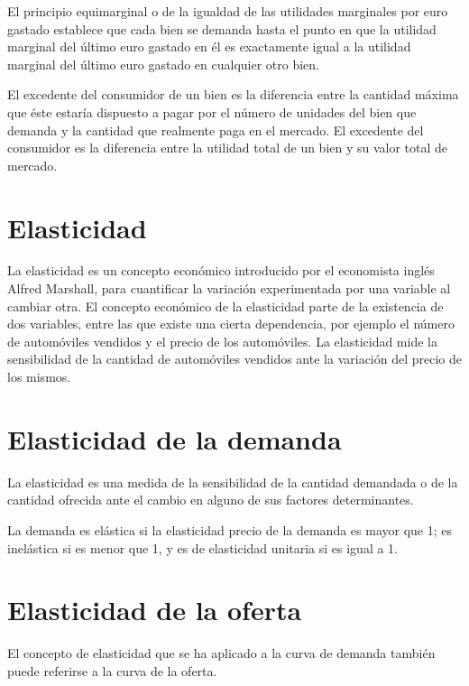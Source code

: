 \documentclass[
]{krantz}
\begin{document}
El principio equimarginal o de la igualdad de las utilidades marginales por euro gastado establece que cada bien se demanda hasta el punto en que la utilidad marginal del último euro gastado en él es exactamente igual a la utilidad marginal del último euro gastado en cualquier otro bien.

El excedente del consumidor de un bien es la diferencia entre la cantidad máxima que éste estaría dispuesto a pagar por el número de unidades del bien que demanda y la cantidad que realmente paga en el mercado. El excedente del consumidor es la diferencia entre la utilidad total de un bien y su valor total de mercado.

\hypertarget{elasticidad}{%
\section{Elasticidad}\label{elasticidad}}

La elasticidad es un concepto económico introducido por el economista inglés Alfred Marshall, para cuantificar la variación experimentada por una variable al cambiar otra. El concepto económico de la elasticidad parte de la existencia de dos variables, entre las que existe una cierta dependencia, por ejemplo el número de automóviles vendidos y el precio de los automóviles. La elasticidad mide la sensibilidad de la cantidad de automóviles vendidos ante la variación del precio de los mismos.

\hypertarget{elasticidad-de-la-demanda}{%
\section{Elasticidad de la demanda}\label{elasticidad-de-la-demanda}}

La elasticidad es una medida de la sensibilidad de la cantidad demandada o de la cantidad ofrecida ante el cambio en alguno de sus factores determinantes.

La demanda es elástica si la elasticidad precio de la demanda es mayor que 1; es inelástica si es menor que 1, y es de elasticidad unitaria si es igual a 1.

\hypertarget{elasticidad-de-la-oferta}{%
\section{Elasticidad de la oferta}\label{elasticidad-de-la-oferta}}

El concepto de elasticidad que se ha aplicado a la curva de demanda también puede referirse a la curva de la oferta.
\end{document}
